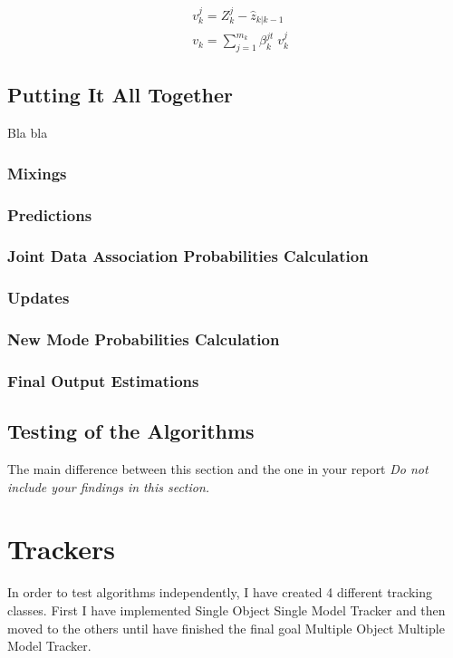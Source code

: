\documentclass[peerreview]{IEEEtran}
\begin{document}
\begin{equation}
\begin{aligned}
&v^j_k = Z^j_k - \hat{z}_{k|k-1} \\
&v_k = \sum\limits_{j=1}^{m_k} \beta^{jt}_k \; v^j_k
\end{aligned}
\end{equation}



\subsection{Putting It All Together}
Bla bla

\subsubsection{Mixings}
\subsubsection{Predictions}
\subsubsection{Joint Data Association Probabilities Calculation}
\subsubsection{Updates}
\subsubsection{New Mode Probabilities Calculation}
\subsubsection{Final Output Estimations}


\subsection{Testing of the Algorithms}
The main difference between this section and the one in your report 
\emph{Do not include your findings in this section.}

\section{Trackers}
In order to test algorithms independently, I have created 4 different tracking classes. First I have implemented Single Object Single Model Tracker and then moved to the others until have finished the final goal Multiple Object Multiple Model Tracker.
\end{document}
